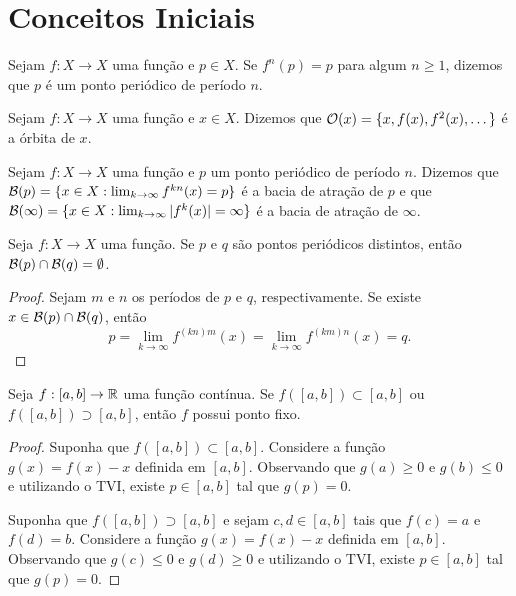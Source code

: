 \section{Conceitos Iniciais}

\begin{definition}
Sejam $f: X \to X$ uma função e $p \in X$. Se $f^n(p) = p$ para algum $n \geq 1$, dizemos que $p$ é um ponto periódico de período $n$.
\end{definition}

\begin{definition}
Sejam $f: X \to X$ uma função e $x \in X$. Dizemos que $\mathcal{O}(x) = \{ x, f(x), f^2(x), \dots \}$ é a órbita de $x$.
\end{definition}

\begin{definition}
Sejam $f: X \to X$ uma função e $p$ um ponto periódico de período $n$. Dizemos que $\mathcal{B} (p) = \{ x \in  X: \lim_{k \to \infty} f^{kn}(x) = p \}$ é a bacia de atração de $p$ e que $\mathcal{B} (\infty) = \{ x \in  X: \lim_{k \to \infty} |f^k(x)| = \infty \}$ é a bacia de atração de $\infty$.
\end{definition}

\begin{proposition}
Seja $f: X \to X$ uma função. Se $p$ e $q$ são pontos periódicos distintos, então $\mathcal{B}(p) \cap \mathcal{B}(q) = \emptyset$.
\end{proposition}

\begin{proof}
Sejam $m$ e $n$ os períodos de $p$ e $q$, respectivamente. Se existe $x \in \mathcal{B}(p) \cap \mathcal{B}(q)$, então
$$p = \lim_{k \to \infty} f^{(kn)m}(x) = \lim_{k \to \infty} f^{(km)n}(x) = q.$$
\end{proof}

\begin{proposition} \label{prop 1-1}
Seja $f: [a, b] \to \mathbb{R}$ uma função contínua. Se $f([a, b]) \subset [a, b]$ ou $f([a, b]) \supset [a, b]$, então $f$ possui ponto fixo.
\end{proposition}

\begin{proof}
Suponha que $f([a, b]) \subset [a, b]$. Considere a função $g(x) = f(x) - x$ definida em $[a, b]$. Observando que $g(a) \geq 0$ e $g(b) \leq 0$ e utilizando o TVI, existe $p \in [a, b]$ tal que $g(p) = 0$.

Suponha que $f([a, b]) \supset [a, b]$ e sejam $c, d \in [a, b]$ tais que $f(c) = a$ e $f(d) = b$. Considere a função $g(x) = f(x) - x$ definida em $[a, b]$. Observando que $g(c) \leq 0$ e $g(d) \geq 0$ e utilizando o TVI, existe $p \in [a, b]$ tal que $g(p) = 0$.
\end{proof}

